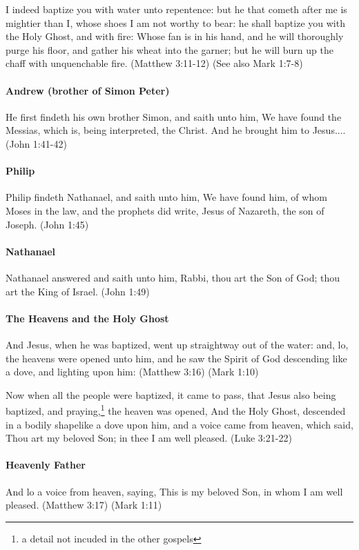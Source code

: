 I indeed baptize you with water unto repentence: but he that cometh after me is mightier than I, whose shoes I am not worthy to bear: he shall baptize you with the Holy Ghost, and with fire: Whose fan is in his hand, and he will thoroughly purge his floor, and gather his wheat into the garner; but he will burn up the chaff with unquenchable fire. (Matthew 3:11-12) (See also Mark 1:7-8)

\paragraph{Andrew (brother of Simon Peter)}
He first findeth his own brother Simon, and saith unto him, We have found the Messias, which is, being interpreted, the Christ. And he brought him to Jesus.... (John 1:41-42)

\paragraph{Philip}
Philip findeth Nathanael, and saith unto him, We have found him, of whom Moses in the law, and the prophets did write, Jesus of Nazareth, the son of Joseph. (John 1:45)

\paragraph{Nathanael}
Nathanael answered and saith unto him, Rabbi, thou art the Son of God; thou art the King of Israel. (John 1:49)

\paragraph{The Heavens and the Holy Ghost}
And Jesus, when he was baptized, went up straightway out of the water: and, lo, the heavens were opened unto him, and he saw the Spirit of God descending like a dove, and lighting upon him: (Matthew 3:16) (Mark 1:10)

Now when all the people were baptized, it came to pass, that Jesus also being baptized, and praying,\footnote{a detail not incuded in the other gospels} the heaven was opened, And the Holy Ghost, descended in a bodily shape\footnotemark[\value{footnote}] like a dove upon him, and a voice came from heaven, which said, Thou art my beloved Son; in thee I am well pleased. (Luke 3:21-22)

\paragraph{Heavenly Father}
And lo a voice from heaven, saying, This is my beloved Son, in whom I am well pleased. (Matthew 3:17) (Mark 1:11)


